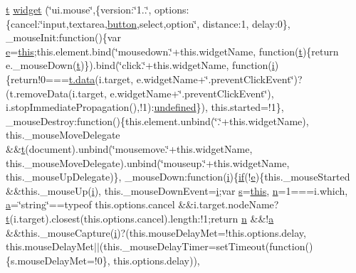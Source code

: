 \begin{DoxyCompactItemize}
\hyperlink{jquery-ui_8min_8js_acf335ef347969ef6dc8387e680fb289e}{t} \hyperlink{jquery-ui_8min_8js_a7045c273995cc5d25194ae884bacf39c}{widget} (\char`\"{}ui.\+mouse\char`\"{},\{version\+:\char`\"{}1..\char`\"{}, options\+:\{cancel\+:\char`\"{}input,textarea,\hyperlink{bootstrap_8min_8js_a55e170814e74f6c3db8ae9ea3ba9054f}{button},select,option\char`\"{}, distance\+:1, delay\+:0\}, \+\_\+mouse\+Init\+:function()\{var \hyperlink{jquery-ui_8min_8js_abea95a4e94bc6f4151d5683d4c12c3f4}{e}=\hyperlink{table_2plugin_8min_8js_a05c09a5e9d53fa7adf0a7936038c2fa3}{this};this.\+element.\+bind(\char`\"{}mousedown.\char`\"{}+this.\+widget\+Name, function(\hyperlink{jquery-ui_8min_8js_acf335ef347969ef6dc8387e680fb289e}{t})\{return e.\+\_\+mouse\+Down(\hyperlink{jquery-ui_8min_8js_acf335ef347969ef6dc8387e680fb289e}{t})\}).bind(\char`\"{}click.\char`\"{}+this.\+widget\+Name, function(\hyperlink{jquery-ui_8min_8js_a83e0f8a79d7f496783fc7527db51773e}{i})\{return!0===\hyperlink{components_2_ossn_comments_2actions_2comment_2edit_8php_a2b67189b42ab547221cb2a6408f4746a}{t.\+data}(i.\+target, e.\+widget\+Name+\char`\"{}.prevent\+Click\+Event\char`\"{})?(t.\+remove\+Data(i.\+target, e.\+widget\+Name+\char`\"{}.prevent\+Click\+Event\char`\"{}), i.\+stop\+Immediate\+Propagation(),!1)\+:\hyperlink{jquery-1_811_81_8min_8js_ae21cc36bf0d65014c717a481a3f8a468}{undefined}\}), this.\+started=!1\}, \+\_\+mouse\+Destroy\+:function()\{this.\+element.\+unbind(\char`\"{}.\char`\"{}+this.\+widget\+Name), this.\+\_\+mouse\+Move\+Delegate \&\&\hyperlink{jquery-ui_8min_8js_acf335ef347969ef6dc8387e680fb289e}{t}(document).unbind(\char`\"{}mousemove.\char`\"{}+this.\+widget\+Name, this.\+\_\+mouse\+Move\+Delegate).unbind(\char`\"{}mouseup.\char`\"{}+this.\+widget\+Name, this.\+\_\+mouse\+Up\+Delegate)\}, \+\_\+mouse\+Down\+:function(\hyperlink{jquery-ui_8min_8js_a83e0f8a79d7f496783fc7527db51773e}{i})\{\hyperlink{jquery_8tokeninput_8js_ad8dd46a3cbc004569e34401e9e71771a}{if}(!\hyperlink{jquery-ui_8min_8js_abea95a4e94bc6f4151d5683d4c12c3f4}{e})\{this.\+\_\+mouse\+Started \&\&this.\+\_\+mouse\+Up(\hyperlink{jquery-ui_8min_8js_a83e0f8a79d7f496783fc7527db51773e}{i}), this.\+\_\+mouse\+Down\+Event=\hyperlink{jquery-ui_8min_8js_a83e0f8a79d7f496783fc7527db51773e}{i};var \hyperlink{paste_2plugin_8min_8js_a43ae144ee2a4e493fea41ca42f795b14}{s}=\hyperlink{table_2plugin_8min_8js_a05c09a5e9d53fa7adf0a7936038c2fa3}{this}, \hyperlink{fullpage_2plugin_8min_8js_ab767a859d1217315f42c9bb52fc648dc}{n}=1===i.\+which, \hyperlink{_chart_8min_8js_aef3b685c08bc6c76c8e729bd0e93901d}{a}=\char`\"{}string\char`\"{}==typeof this.\+options.\+cancel \&\&i.\+target.\+node\+Name?\hyperlink{jquery-ui_8min_8js_acf335ef347969ef6dc8387e680fb289e}{t}(i.\+target).closest(this.\+options.\+cancel).length\+:!1;return \hyperlink{fullpage_2plugin_8min_8js_ab767a859d1217315f42c9bb52fc648dc}{n} \&\&!\hyperlink{_chart_8min_8js_aef3b685c08bc6c76c8e729bd0e93901d}{a} \&\&this.\+\_\+mouse\+Capture(\hyperlink{jquery-ui_8min_8js_a83e0f8a79d7f496783fc7527db51773e}{i})?(this.\+mouse\+Delay\+Met=!this.\+options.\+delay, this.\+mouse\+Delay\+Met$\vert$$\vert$(this.\+\_\+mouse\+Delay\+Timer=set\+Timeout(function()\{s.\+mouse\+Delay\+Met=!0\}, this.\+options.\+delay)), 
\end{DoxyCompactItemize}
